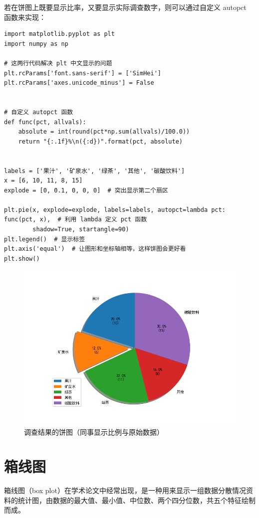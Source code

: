 若在饼图上既要显示比率，又要显示实际调查数字，则可以通过自定义 autopct 函数来实现：
\begin{lstlisting}[Language=Python]
import matplotlib.pyplot as plt
import numpy as np

# 这两行代码解决 plt 中文显示的问题
plt.rcParams['font.sans-serif'] = ['SimHei']
plt.rcParams['axes.unicode_minus'] = False


# 自定义 autopct 函数
def func(pct, allvals):
    absolute = int(round(pct*np.sum(allvals)/100.0))
    return "{:.1f}%\n({:d})".format(pct, absolute)


labels = ['果汁', '矿泉水', '绿茶', '其他', '碳酸饮料']
x = [6, 10, 11, 8, 15]
explode = [0, 0.1, 0, 0, 0]  # 突出显示第二个扇区

plt.pie(x, explode=explode, labels=labels, autopct=lambda pct: func(pct, x),  # 利用 lambda 定义 pct 函数
        shadow=True, startangle=90)
plt.legend()  # 显示标签
plt.axis('equal')  # 让图形和坐标轴相等，这样饼图会更好看
plt.show()
\end{lstlisting}

\begin{figure}[!ht]
  \centering
  \includegraphics[scale=0.7]{figure/pie2.png}
  \caption{调查结果的饼图（同事显示比例与原始数据）}\label{fig:pie}
\end{figure}

\clearpage
\section{箱线图}

箱线图（box plot）在学术论文中经常出现，是一种用来显示一组数据分散情况资料的统计图，由数据的最大值、最小值、中位数、两个四分位数，共五个特征绘制而成。


